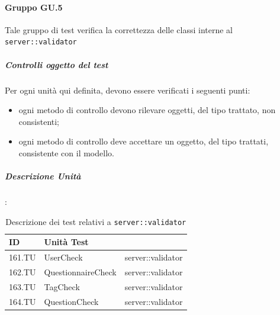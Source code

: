 \documentclass[12pt,a4paper]{article}
\begin{document}
\paragraph{Gruppo GU.5}
Tale gruppo di test verifica la correttezza delle classi interne al  \texttt{server::validator}
\subparagraph{Controlli oggetto del test}
Per ogni unità  qui definita, devono essere verificati i seguenti punti:
\begin{itemize}
	\item ogni metodo di controllo devono rilevare oggetti, del tipo trattato, non consistenti;
	\item ogni metodo di controllo deve accettare un oggetto, del tipo trattati, consistente con il modello.
\end{itemize}
\subparagraph{Descrizione Unità}:
\begin{table}[H]
	\begin{center}
		\begin{tabular}{p{} p{} p{}}
			\toprule
			\textbf{ID}   & \textbf{Unità Test}	& \textbf{\mgls{package}} \\ \midrule
			\midrule
			161.TU & UserCheck & server::validator\\ \midrule
			162.TU & QuestionnaireCheck & server::validator\\ \midrule
			163.TU & TagCheck & server::validator\\ \midrule
			164.TU & QuestionCheck & server::validator\\ \midrule			
			\bottomrule
		\end{tabular}
	\end{center}
	\caption{Descrizione dei test relativi a \texttt{server::validator}}
\end{table}
\end{document}
